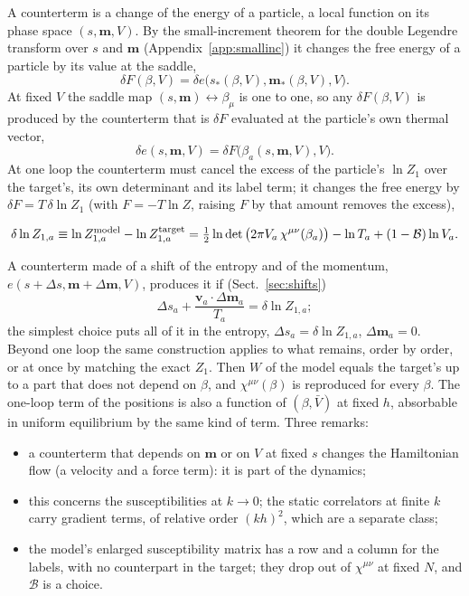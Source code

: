 \documentclass[11pt,aps,preprint,nofootinbib,superscriptaddress,tightenlines]{revtex4-2}
\newcommand{\klab}{\mathcal B}
\def\st{\begin{equation}}
\def\stp{\end{equation}}
\def\Sect#1{Sect.~\ref{#1}}
\def\App#1{Appendix~\ref{#1}}
\begin{document}
A counterterm is a change of the energy of a particle, a local function on its phase space $(s,\bm m,V)$.  By the small-increment theorem for the double Legendre
transform over $s$ and $\bm m$ (\App{app:smallinc}) it changes the free energy of a particle by its value at the saddle,
\st
\delta F(\beta,V)=\delta e\big(s_*(\beta,V),\bm m_*(\beta,V),V\big) .
\stp
At fixed $V$ the saddle map $(s,\bm m)\leftrightarrow\beta_\mu$ is one to one, so any $\delta F(\beta,V)$ is produced by the counterterm that is $\delta F$ evaluated at the particle's
own thermal vector,
\st
\delta e(s,\bm m,V)=\delta F\big(\beta_a(s,\bm m,V),V\big) .
\stp
At one loop the counterterm must cancel the excess of the particle's $\ln Z_1$ over the target's, its own determinant and its label term; it changes the free energy by
$\delta F=T\,\delta\ln Z_1$ (with $F=-T\ln Z$, raising $F$ by that amount removes the excess),
\begin{keyeq}
\st
\delta\ln Z_{1,a}\equiv\ln Z_{1,a}^{\rm model}-\ln Z_{1,a}^{\rm target}=\tfrac12\ln\det\big(2\pi V_a\,\chi^{\mu\nu}(\beta_a)\big)-\ln T_a+(1-\klab)\ln V_a .
\label{ctfull}
\stp
\end{keyeq}
A counterterm made of a shift of the entropy and of the momentum, $e(s+\Delta s,\bm m+\Delta\bm m,V)$, produces it if (\Sect{sec:shifts})
\st
\Delta s_a+\frac{\bm v_a\cdot\Delta\bm m_a}{T_a}=\delta\ln Z_{1,a} ;
\label{ctcondition}
\stp
the simplest choice puts all of it in the entropy, $\Delta s_a=\delta\ln Z_{1,a}$, $\Delta\bm m_a=0$.
Beyond one loop the same construction applies to what remains, order by order, or at once by matching the exact $Z_1$.  Then $W$ of the model equals the target's up to
a part that does not depend on $\beta$, and $\chi^{\mu\nu}(\beta)$ is reproduced for every $\beta$.  The one-loop term of the positions is also a function of $(\beta,\bar V)$ at
fixed $h$, absorbable in uniform equilibrium by the same kind of term.  Three remarks:
\begin{itemize}
\item a counterterm that depends on $\bm m$ or on $V$ at fixed $s$ changes the Hamiltonian flow (a velocity and a force term): it is part of the dynamics;
\item this concerns the susceptibilities at $k\to0$; the static correlators at finite $k$ carry gradient terms, of relative order $(kh)^2$, which are a separate class;
\item the model's enlarged susceptibility matrix has a row and a column for the labels, with no counterpart in the target; they drop out of $\chi^{\mu\nu}$ at fixed $N$,
  and $\klab$ is a choice.
\end{itemize}
\end{document}
